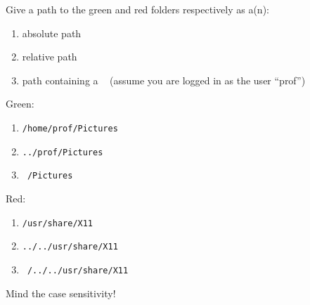 \documentclass[english]{sheet}
\begin{document}
\begin{exercise}[subtitle=Filesystem Paths]
    \bigskip

    Give a path to the green and red folders respectively as a(n):
    \begin{enumerate}
        \item absolute path
        \item relative path
        \item path containing a \texttt{~} (assume you are logged in as the user ``prof'')
    \end{enumerate}
\end{exercise}

\begin{solution}
    Green:
    \begin{enumerate}
        \item \texttt{/home/prof/Pictures}
        \item \texttt{../prof/Pictures}
        \item \texttt{~/Pictures}
    \end{enumerate}
    Red:
    \begin{enumerate}
        \item \texttt{/usr/share/X11}
        \item \texttt{../../usr/share/X11}
        \item \texttt{~/../../usr/share/X11}
    \end{enumerate}
    Mind the case sensitivity!
\end{solution}
\end{document}
